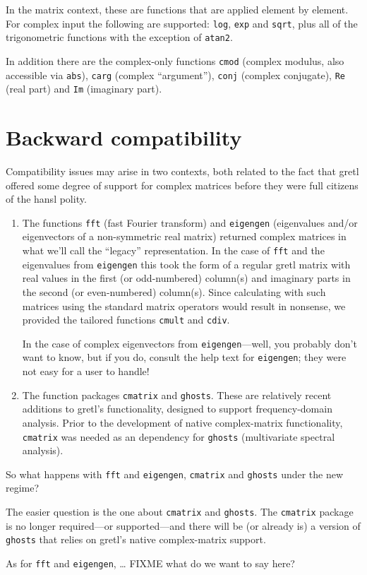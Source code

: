 \documentclass{article}
\begin{document}
In the matrix context, these are functions that are applied element by
element. For complex input the following are supported: \texttt{log},
\texttt{exp} and \texttt{sqrt}, plus all of the trigonometric
functions with the exception of \texttt{atan2}.

In addition there are the complex-only functions \texttt{cmod}
(complex modulus, also accessible via \texttt{abs}), \texttt{carg}
(complex ``argument''), \texttt{conj} (complex conjugate), \texttt{Re}
(real part) and \texttt{Im} (imaginary part).

\section{Backward compatibility}
\label{sec:compat}

Compatibility issues may arise in two contexts, both related to the
fact that gretl offered some degree of support for complex matrices
before they were full citizens of the hansl polity.

\begin{enumerate}
\item The functions \texttt{fft} (fast Fourier transform) and
  \texttt{eigengen} (eigenvalues and/or eigenvectors of a
  non-symmetric real matrix) returned complex matrices in what we'll
  call the ``legacy'' representation. In the case of \texttt{fft} and
  the eigenvalues from \texttt{eigengen} this took the form of a
  regular gretl matrix with real values in the first (or odd-numbered)
  column(s) and imaginary parts in the second (or even-numbered)
  column(s). Since calculating with such matrices using the standard
  matrix operators would result in nonsense, we provided the tailored
  functions \texttt{cmult} and \texttt{cdiv}.

  In the case of complex eigenvectors from \texttt{eigengen}---well,
  you probably don't want to know, but if you do, consult the help text
  for \texttt{eigengen}; they were not easy for a user to handle!
\item The function packages \texttt{cmatrix} and
  \texttt{ghosts}. These are relatively recent additions to gretl's
  functionality, designed to support frequency-domain analysis. Prior
  to the development of native complex-matrix functionality,
  \texttt{cmatrix} was needed as an dependency for \texttt{ghosts}
  (multivariate spectral analysis).
\end{enumerate}

So what happens with \texttt{fft} and \texttt{eigengen},
\texttt{cmatrix} and \texttt{ghosts} under the new regime?

The easier question is the one about \texttt{cmatrix} and
\texttt{ghosts}. The \texttt{cmatrix} package is no longer
required---or supported---and there will be (or already is) a version
of \texttt{ghosts} that relies on gretl's native complex-matrix
support.

As for \texttt{fft} and \texttt{eigengen}, \dots{} FIXME what do we
want to say here?
\end{document}
